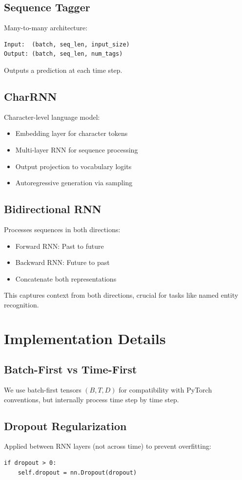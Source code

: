 \documentclass[12pt]{article}
\begin{document}
\subsection{Sequence Tagger}
Many-to-many architecture:
\begin{verbatim}
Input:  (batch, seq_len, input_size)
Output: (batch, seq_len, num_tags)
\end{verbatim}
Outputs a prediction at each time step.

\subsection{CharRNN}
Character-level language model:
\begin{itemize}
    \item Embedding layer for character tokens
    \item Multi-layer RNN for sequence processing
    \item Output projection to vocabulary logits
    \item Autoregressive generation via sampling
\end{itemize}

\subsection{Bidirectional RNN}
Processes sequences in both directions:
\begin{itemize}
    \item Forward RNN: Past to future
    \item Backward RNN: Future to past
    \item Concatenate both representations
\end{itemize}

This captures context from both directions, crucial for tasks like named entity recognition.

\section{Implementation Details}

\subsection{Batch-First vs Time-First}
We use batch-first tensors $(B, T, D)$ for compatibility with PyTorch conventions, but internally process time step by time step.

\subsection{Dropout Regularization}
Applied between RNN layers (not across time) to prevent overfitting:
\begin{verbatim}
if dropout > 0:
    self.dropout = nn.Dropout(dropout)
\end{verbatim}
\end{document}
